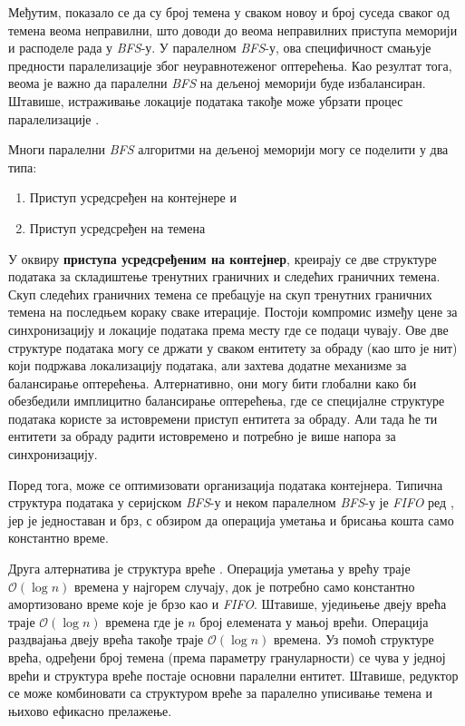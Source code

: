 \par
Међутим, показало се да су број темена у сваком новоу и број суседа сваког од темена веома неправилни, што доводи до веома неправилних приступа меморији и расподеле рада у \textit{BFS}-у. У паралелном \textit{BFS}-у, ова специфичност смањује предности паралелизације због неуравнотеженог оптерећења. Као резултат тога, веома је важно да паралелни \textit{BFS} на дељеној меморији буде избалансиран. Штавише, истраживање локације података такође може убрзати процес паралелизације \cite{bfs-par}.

\par
Многи паралелни \textit{BFS} алгоритми на дељеној меморији могу се поделити у два типа:
\begin{enumerate}
    \vspace{-5mm}
    \item Приступ усредсређен на контејнере \cite{bfs-par} и
    \item Приступ усредсређен на темена \cite{bfs-par}
\end{enumerate}
 
 \par
 У оквиру \textbf{приступа усредсређеним на контејнер}, креирају се две структуре података за складиштење тренутних граничних и следећих граничних темена. Скуп следећих граничних темена се пребацује на скуп тренутних граничних темена на последњем кораку сваке итерације. Постоји компромис између цене за синхронизацију и локације података према месту где се подаци чувају. Ове две структуре података могу се држати у сваком ентитету за обраду (као што је нит) који подржава локализацију података, али захтева додатне механизме за балансирање оптерећења. Алтернативно, они могу бити глобални како би обезбедили имплицитно балансирање оптерећења, где се специјалне структуре података користе за истовремени приступ ентитета за обраду. Али тада ће ти ентитети за обраду радити истовремено и потребно је више напора за синхронизацију.

\par
Поред тога, може се оптимизовати организација података контејнера. Типична структура података у серијском \textit{BFS}-у и неком паралелном \textit{BFS}-у је \textit{FIFO} ред \cite{fifo}, јер је једноставан и брз, с обзиром да операција уметања и брисања кошта само константно време.

\par
Друга алтернатива је структура вреће \cite{bag}. Операција уметања у врећу траје $\mathcal{O}(\log{n})$ времена у најгорем случају, док је потребно само константно амортизовано време које је брзо као и \textit{FIFO}. Штавише, уједињење двеју врећа траје $\mathcal{O}(\log{n})$ времена где је $n$ број елемената у мањој врећи. Операција раздвајања двеју врећа такође траје $\mathcal{O}(\log{n})$ времена. Уз помоћ структуре врећа, одређени број темена (према параметру грануларности) се чува у једној врећи и структура вреће постаје основни паралелни ентитет. Штавише, редуктор се може комбиновати са структуром вреће за паралелно уписивање темена и њихово ефикасно прелажење.

